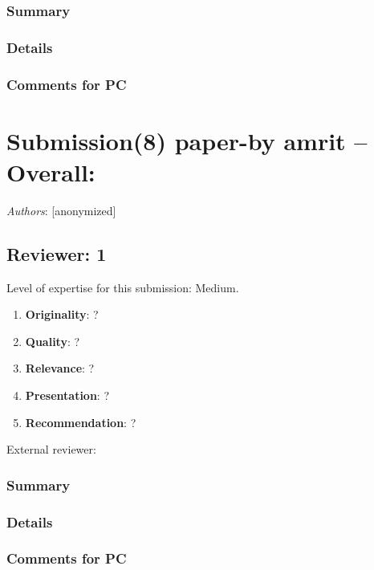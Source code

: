 \documentclass{article}
\begin{document}
   \subsubsection*{Summary}
   
      
   \subsubsection*{Details}
   

   \subsubsection*{Comments for PC}
   

 

\section{Submission(8) paper-by amrit -- Overall: }  

\textit{Authors}: [anonymized]

     
 \subsection{Reviewer:  1 }
    
   Level of expertise for this submission: Medium.   
\begin{enumerate}
    
      \item \textbf{Originality}: ?
      \item \textbf{Quality}: ?
      \item \textbf{Relevance}: ?
      \item \textbf{Presentation}: ?
      \item \textbf{Recommendation}: ?
 \end{enumerate}
External reviewer:      
   \subsubsection*{Summary}
   
      
   \subsubsection*{Details}
   

   \subsubsection*{Comments for PC}
   

\end{document}
